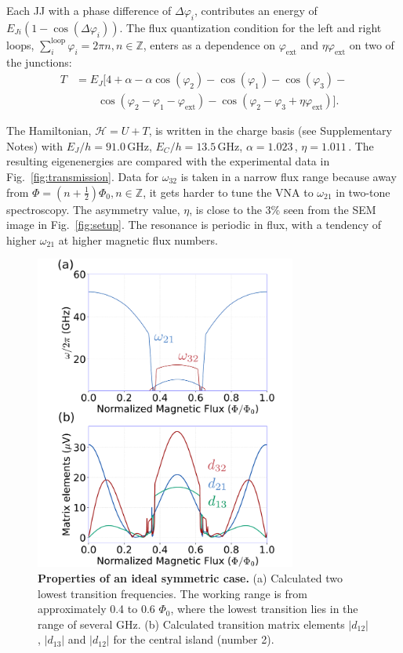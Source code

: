 \documentclass[%
reprint,
superscriptaddress,
bibnotes,
amsmath,
amssymb,
aps,
showkeys,
prb,
]{revtex4-2}
\newcommand{\iunit}[2]{\ensuremath{#1\,\text{#2}}}
\begin{document}
Each  JJ  with  a  phase  difference  of  $\Delta\varphi_{i}$,  contributes  an  energy  of
$ E_{Ji}\left(1 - \cos(\Delta\varphi_i)\right) $.   The flux quantization condition for the
left                     and                    right                     loops,
$ \sum_{i}^{\text{loop}}  \varphi_i = 2\pi  n, n \in \mathbb{Z}$,  enters as a  dependence on
$ \varphi_\text{ext} $ and $ \eta\varphi_\text{ext} $ on two of the junctions:
\begin{equation}\label{eq:kinetic}
  \begin{aligned}
    T & = E_J\big[4 + \alpha - \alpha\cos(\varphi_{2}) -\cos(\varphi_{1}) -\cos(\varphi_{3}) - \\
    &  \qquad  \cos(\varphi_{2}   -  \varphi_{1}  -  \varphi_{\text{ext}})  -  \cos(\varphi_{2}   -  \varphi_{3}  +
    \eta\varphi_{\text{ext}})\big].
  \end{aligned}
\end{equation}

The  Hamiltonian, $\mathcal{H}= U + T$, is  written  in  the charge  basis (see  Supplementary Notes)  with
\iunit{E_J/h = 91.0}{GHz}, \iunit{E_C/h = 13.5}{GHz}, \iunit{\alpha = 1.023}{}, \iunit{\eta
  = 1.011}{}. The resulting eigenenergies are compared with the experimental data in
Fig.~\ref{fig:transmission}.  Data for $ \omega_{32} $ is taken in a narrow flux range
because away from $ \Phi = (n + \frac{1}{2}) \Phi_0, n\in\mathbb{Z} $, it gets harder to tune the VNA to
$ \omega_{21} $  in two-tone spectroscopy.  The  asymmetry value, $ \eta $,  is close to
the  3\%  seen  from  the   SEM  image  in
Fig.~\ref{fig:setup}.  The  resonance is  periodic in flux,  with a  tendency of
higher $\omega_{21}$ at higher magnetic flux numbers.

\begin{figure}
  \includegraphics[width=86mm]{fig3}
  \caption{\small \textbf{Properties of an ideal symmetric case.} 
  (a) Calculated two lowest transition frequencies. The working range is from approximately 0.4 to 0.6 $\Phi_0$, where the lowest transition lies in the range of several GHz. (b) Calculated transition matrix elements $|d_{12}|$, $|d_{13}|$ and $|d_{12}|$ for the central island (number 2). 
  \label{fig:simulations}}
\end{figure}
\end{document}
